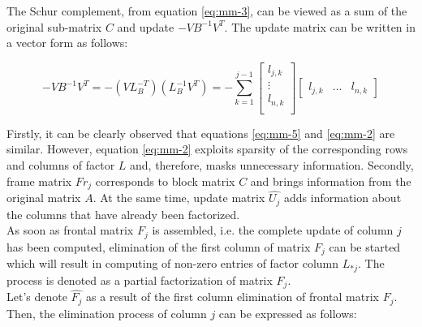 The Schur complement, from equation \ref{eq:mm-3}, can be viewed as a sum of the original sub-matrix $C$ and update $-VB^{-1}V^{T}$. The update matrix can be written in a vector form as follows:

\begin{equation} \label{eq:mm-5}
	-VB^{-1}V^{T} = -(VL^{-T}_{B})(L^{-1}_{B}V^{T}) = - \sum_{k=1}^{j-1}  \begin{bmatrix}
l_{j,k} \\
\vdots \\
l_{n,k} \\
\end{bmatrix} \begin{bmatrix}
l_{j,k} & \dots & l_{n,k}
\end{bmatrix} 
\end{equation}

Firstly, it can be clearly observed that equations \ref{eq:mm-5} and \ref{eq:mm-2} are similar. However, equation \ref{eq:mm-2} exploits sparsity of the corresponding rows and columns of factor $L$ and, therefore, masks unnecessary information. Secondly, frame matrix $Fr_{j}$ corresponds to block matrix $C$ and brings information from the original matrix $A$. At the same time, update matrix $\hat{U_{j}}$ adds information about the columns that have already been factorized.\\




As soon as frontal matrix $F_{j}$ is assembled, i.e. the complete update of column $j$ has been computed, elimination of the first column of matrix $F_{j}$ can be started which will result in computing of non-zero entries of factor column $L_{*j}$. The process is denoted as a partial factorization of matrix $F_{j}$.\\

Let's denote $\hat{F_{j}}$ as a result of the first column elimination of frontal matrix $F_{j}$. Then, the elimination process of column $j$ can be expressed as follows:\\



